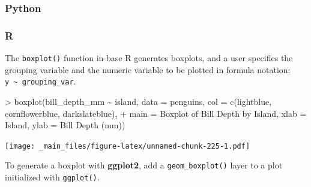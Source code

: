 \documentclass[
]{book}
\newenvironment{Shaded}{\begin{snugshade}}{\end{snugshade}}
\newcommand{\AttributeTok}[1]{\textcolor[rgb]{0.77,0.63,0.00}{#1}}
\newcommand{\FunctionTok}[1]{\textcolor[rgb]{0.00,0.00,0.00}{#1}}
\newcommand{\NormalTok}[1]{#1}
\newcommand{\SpecialCharTok}[1]{\textcolor[rgb]{0.00,0.00,0.00}{#1}}
\newcommand{\StringTok}[1]{\textcolor[rgb]{0.31,0.60,0.02}{#1}}
\begin{document}
\hypertarget{python-42}{%
\subsubsection*{Python}\label{python-42}}

\hypertarget{r-42}{%
\subsubsection*{R}\label{r-42}}

The \texttt{boxplot()} function in base R generates boxplots, and a user specifies the grouping variable and the numeric variable to be plotted in formula notation: \texttt{y\ \textasciitilde{}\ grouping\_var}.

\begin{Shaded}
\begin{Highlighting}[]
\SpecialCharTok{\textgreater{}} \FunctionTok{boxplot}\NormalTok{(bill\_depth\_mm }\SpecialCharTok{\textasciitilde{}}\NormalTok{ island, }\AttributeTok{data =}\NormalTok{ penguins, }\AttributeTok{col =} \FunctionTok{c}\NormalTok{(}\StringTok{\textquotesingle{}lightblue\textquotesingle{}}\NormalTok{, }\StringTok{\textquotesingle{}cornflowerblue\textquotesingle{}}\NormalTok{, }\StringTok{\textquotesingle{}darkslateblue\textquotesingle{}}\NormalTok{),}
\SpecialCharTok{+}         \AttributeTok{main =} \StringTok{\textquotesingle{}Boxplot of Bill Depth by Island\textquotesingle{}}\NormalTok{, }\AttributeTok{xlab =} \StringTok{\textquotesingle{}Island\textquotesingle{}}\NormalTok{, }\AttributeTok{ylab =} \StringTok{\textquotesingle{}Bill Depth (mm)\textquotesingle{}}\NormalTok{)}
\end{Highlighting}
\end{Shaded}

\texttt{[image: \_main\_files/figure-latex/unnamed-chunk-225-1.pdf]}

To generate a boxplot with \textbf{ggplot2}, add a \texttt{geom\_boxplot()} layer to a plot initialized with \texttt{ggplot()}.
\end{document}
